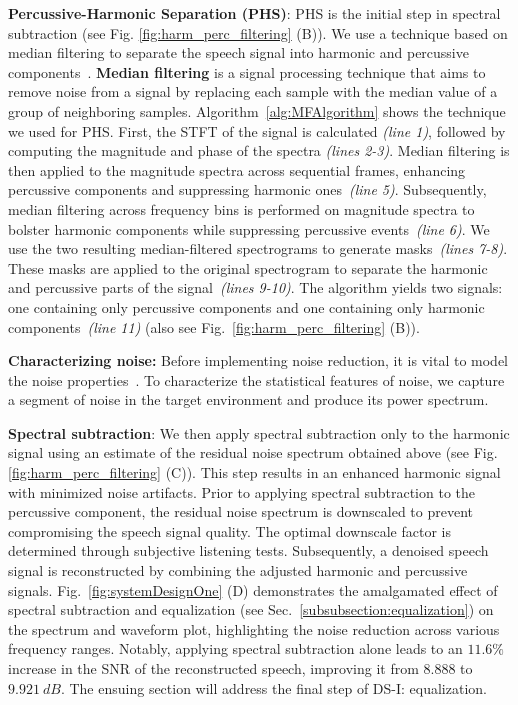 \textbf{Percussive-Harmonic Separation (PHS)}: PHS is the initial step in spectral subtraction (see Fig. \ref{fig:harm_perc_filtering} (B)). We use a technique based on median filtering to separate the speech signal into harmonic and percussive components~\cite{fitzgerald2010harmonic, driedger2014extending}. 
\textbf{Median filtering} is a signal processing technique that aims to remove noise from a signal by replacing each sample with the median value of a group of neighboring samples. 
Algorithm~\ref{alg:MFAlgorithm} shows the technique we used for PHS. 
First, the STFT of the signal is calculated \textit{(line 1)}, followed by computing the magnitude and phase of the spectra \textit{(lines 2-3)}.
Median filtering is then applied to the magnitude spectra across sequential frames, enhancing percussive components and suppressing harmonic ones~\textit{(line 5)}.
Subsequently, median filtering across frequency bins is performed on magnitude spectra to bolster harmonic components while suppressing percussive events~\textit{(line 6)}. 
We use the two resulting median-filtered spectrograms to generate masks~\textit{(lines 7-8)}.
These masks are applied to the original spectrogram to separate the harmonic and percussive parts of the signal~\textit{(lines 9-10)}. 
The algorithm yields two signals: one containing only percussive components and one containing only harmonic components~\textit{(line 11)} (also see Fig.~\ref{fig:harm_perc_filtering} (B)). 



\textbf{Characterizing noise:} 
Before implementing noise reduction, it is vital to model the noise properties~\cite{zhang2021influence, nishimura2004noise}. 
To characterize the statistical features of noise, we capture a segment of noise in the target environment and produce its power spectrum.

\textbf{Spectral subtraction}: We then apply spectral subtraction only to the harmonic signal using an estimate of the residual noise spectrum obtained above (see Fig. \ref{fig:harm_perc_filtering} (C)). 
This step results in an enhanced harmonic signal with minimized noise artifacts. 
Prior to applying spectral subtraction to the percussive component, the residual noise spectrum is downscaled to prevent compromising the speech signal quality. 
The optimal downscale factor is determined through subjective listening tests. 
Subsequently, a denoised speech signal is reconstructed by combining the adjusted harmonic and percussive signals. 
Fig.~\ref{fig:systemDesignOne} (D) demonstrates the amalgamated effect of spectral subtraction and equalization (see Sec.~\ref{subsubsection:equalization}) on the spectrum and waveform plot, highlighting the noise reduction across various frequency ranges.
Notably, applying spectral subtraction alone leads to an $11.6\%$ increase in the SNR of the reconstructed speech, improving it from $8.888$ to $9.921~dB$. The ensuing section will address the final step of DS-I: equalization.




